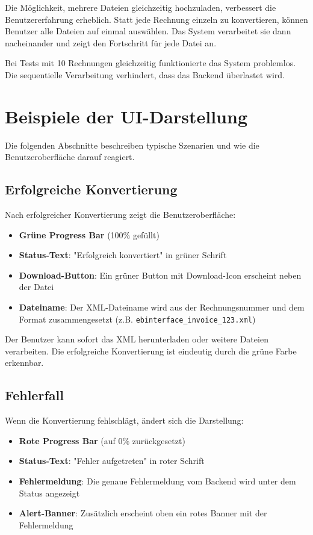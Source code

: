 Die Möglichkeit, mehrere Dateien gleichzeitig hochzuladen, verbessert die Benutzererfahrung erheblich. Statt jede Rechnung einzeln zu konvertieren, können Benutzer alle Dateien auf einmal auswählen. Das System verarbeitet sie dann nacheinander und zeigt den Fortschritt für jede Datei an.

Bei Tests mit 10 Rechnungen gleichzeitig funktionierte das System problemlos. Die sequentielle Verarbeitung verhindert, dass das Backend überlastet wird.

\section{Beispiele der UI-Darstellung}

Die folgenden Abschnitte beschreiben typische Szenarien und wie die Benutzeroberfläche darauf reagiert.

\subsection{Erfolgreiche Konvertierung}

Nach erfolgreicher Konvertierung zeigt die Benutzeroberfläche:

\begin{itemize}
    \item \textbf{Grüne Progress Bar} (100\% gefüllt)
    \item \textbf{Status-Text}: "Erfolgreich konvertiert" in grüner Schrift
    \item \textbf{Download-Button}: Ein grüner Button mit Download-Icon erscheint neben der Datei
    \item \textbf{Dateiname}: Der XML-Dateiname wird aus der Rechnungsnummer und dem Format zusammengesetzt (z.B. \texttt{ebinterface\_invoice\_123.xml})
\end{itemize}

Der Benutzer kann sofort das XML herunterladen oder weitere Dateien verarbeiten. Die erfolgreiche Konvertierung ist eindeutig durch die grüne Farbe erkennbar.

\subsection{Fehlerfall}

Wenn die Konvertierung fehlschlägt, ändert sich die Darstellung:

\begin{itemize}
    \item \textbf{Rote Progress Bar} (auf 0\% zurückgesetzt)
    \item \textbf{Status-Text}: "Fehler aufgetreten" in roter Schrift
    \item \textbf{Fehlermeldung}: Die genaue Fehlermeldung vom Backend wird unter dem Status angezeigt
    \item \textbf{Alert-Banner}: Zusätzlich erscheint oben ein rotes Banner mit der Fehlermeldung
\end{itemize}

